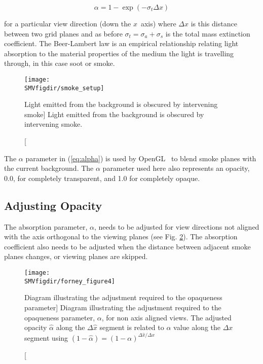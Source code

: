 {\begin{equation}
\label{eq:alpha}
\alpha=1-\exp(-\sigma_t\Delta x)
\end{equation}

\noindent for a particular view direction (down the $x$~axis)
where $\Delta x$ is this distance between two grid planes and as
before $\sigma_t=\sigma_a+\sigma_s$ is the total mass extinction
coefficient.  The Beer-Lambert law is an empirical relationship
relating light absorption to the material properties of the medium
the light is travelling through, in this case soot or smoke.

\begin{figure}[bph]
\begin{center}
\texttt{[image: \\SMVfigdir/smoke\_setup]}
\end{center}
\caption
[Light emitted from the background is obscured by intervening smoke]
{Light emitted from the background is obscured by intervening smoke.
}
\label{figsmokesetup}
\end{figure}

The $\alpha$ parameter in (\ref{eq:alpha}) is used by
OpenGL~\cite{OpenGLRed} to blend smoke planes with the current
background.  The $\alpha$ parameter used here also represents an
opacity, 0.0, for completely transparent, and 1.0 for completely
opaque.


\subsection{Adjusting Opacity}

The absorption parameter, $\alpha$, needs to be adjusted for view
directions not aligned with the axis orthogonal to the viewing
planes (see Fig. \ref{figray}).  The absorption coefficient also
needs to be adjusted when the distance between adjacent smoke
planes changes, or viewing planes are skipped.

\begin{figure}[bph]
\centerline{\texttt{[image: \\SMVfigdir/forney\_figure4]}}
\caption
[Diagram illustrating the adjustment required to the opaqueness parameter]
{Diagram illustrating the adjustment required to the opaqueness
parameter, $\alpha$, for non axis aligned views. The adjusted
opacity $\hat{\alpha}$ along the $\Delta\hat{x}$ segment is
related to $\alpha$ value along the $\Delta x$ segment using
$(1-\hat{\alpha})=(1-\alpha)^{\Delta \hat{x}/\Delta x}$}
\label{figray}
\end{figure}

}
